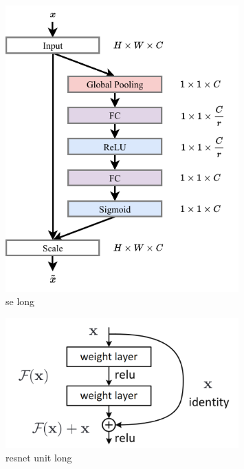 \begin{figure} %
    \includegraphics[width=0.8\textwidth]{diagrams/7-cvn/se.pdf}
    \caption[se short]
    {se long}
    \label{fig:se}
\end{figure} %

\begin{figure} %
    \includegraphics[width=0.8\textwidth]{diagrams/7-cvn/resnet_unit.png}
    \caption[resnet unit short]
    {resnet unit long}
    \label{fig:resnet_unit}
\end{figure} %

